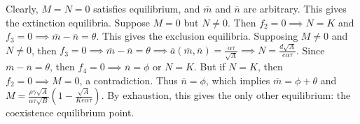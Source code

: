 \documentclass{amsart}
\theoremstyle{definition}
\theoremstyle{remark}
\numberwithin{equation}{section}
\begin{document}
Clearly, $M = N = 0$ satisfies equilibrium, and $\overline{m}$ and $\overline{n}$ are arbitrary.  This gives the extinction equilibria.  Suppose $M = 0$ but $N \neq 0$.  Then $f_2 = 0 \implies N = K$ and $f_3 = 0 \implies \overline{m} - \overline{n} = \theta$.  This gives the exclusion equilibria.  Supposing $M \neq 0$ and $N \neq 0$, then $f_3 = 0 \implies \overline{m} - \overline{n} = \theta \implies \overline{a}(\overline{m}, \overline{n}) = \frac{\alpha\tau}{\sqrt{A}} \implies N = \frac{d\sqrt{A}}{e\alpha\tau}$.  Since $\overline{m} - \overline{n} = \theta$, then $f_4 = 0 \implies \overline{n} = \phi$ or $N = K$.  But if $N = K$, then $f_2 = 0 \implies M = 0$, a contradiction.  Thus $\overline{n} = \phi$, which implies $\overline{m} = \phi + \theta$ and $M = \frac{\rho\gamma\sqrt{A}}{\alpha\tau\sqrt{B}}\left(1 - \frac{\sqrt{A}}{Ke\alpha\tau}\right)$.  By exhaustion, this gives the only other equilibrium: the coexistence equilibrium point.
\end{document}
